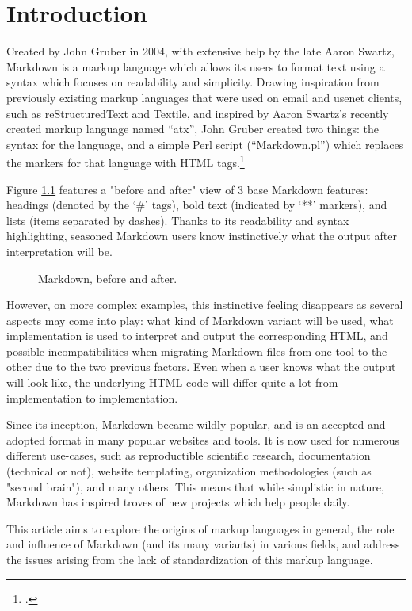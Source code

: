\chapter{Introduction}

\vspace{1cm}

Created by John Gruber in 2004, with extensive help by the late Aaron Swartz, Markdown is a markup language which allows its users to format
text using a syntax which focuses on readability and simplicity.
Drawing inspiration from previously existing markup languages that were used on email and usenet clients, such as reStructuredText and Textile,
and inspired by Aaron Swartz's recently created markup language named ``atx'', John Gruber created two things: the syntax for the language, and a simple
Perl script (``Markdown.pl'') which replaces the markers for that language with HTML tags.\footcite{gruber2004markdown}\newline

Figure \ref{fig:example-simple-syntax} features a "before and after" view of 3 base Markdown features: headings (denoted by the `\#' tags),
bold text (indicated by `**' markers), and lists (items separated by dashes). Thanks to its readability and syntax highlighting, seasoned
Markdown users know instinctively what the output after interpretation will be.

\begin{figure}[H]%
    \hspace{-3cm}
    \qquad
    \caption{Markdown, before and after.}
    \label{fig:example-simple-syntax}
\end{figure}

\newpage

However, on more complex examples, this instinctive feeling disappears as several aspects may come into play: what kind of Markdown variant will
be used, what implementation is used to interpret and output the corresponding HTML, and possible incompatibilities when migrating Markdown files
from one tool to the other due to the two previous factors. Even when a user knows what the output will look like, the underlying HTML code
will differ quite a lot from implementation to implementation.\newline

Since its inception, Markdown became wildly popular, and is an accepted and adopted format in many popular websites and tools. It is now used for
numerous different use-cases, such as reproductible scientific research, documentation (technical or not), website templating, organization
methodologies (such as "second brain"), and many others. This means that while simplistic in nature, Markdown has inspired troves of
new projects which help people daily.\newline

This article aims to explore the origins of markup languages in general, the role and influence of Markdown (and its many variants)
in various fields, and address the issues arising from the lack of standardization of this markup language.
